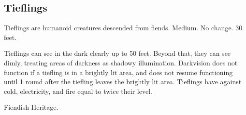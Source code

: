    \subsection{Tieflings}

        Tieflings are humanoid creatures descended from fiends.
         Medium.
         No change.
         30 feet.
        \begin{itemize}
             Tieflings can see in the dark clearly up to 50 feet. Beyond that, they can see dimly, treating areas of darkness as shadowy illumination. Darkvision does not function if a tiefling is in a brightly lit area, and does not resume functioning until 1 round after the tiefling leaves the brightly lit area.
             Tieflings have  against cold, electricity, and fire equal to twice their level.
        \end{itemize}
         Fiendish Heritage.






